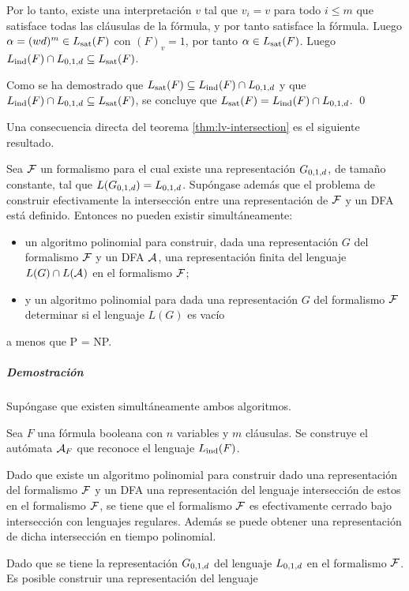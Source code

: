 Por lo tanto, existe una interpretación $v$ tal que $v_i = v$ para todo $i \leq m$ que satisface todas las cláusulas de la fórmula, y por tanto satisface la fórmula. Luego $\alpha = (wd)^m \in L_{\mathrm{sat}}(F)$ con $(F)_v = 1$, por tanto $\alpha \in L_{\mathrm{sat}}(F)$. Luego $L_{\mathrm{ind}}(F) \cap L_{0,1,d} \subseteq L_{\mathrm{sat}}(F)$.

Como se ha demostrado que $L_{\mathrm{sat}}(F) \subseteq L_{\mathrm{ind}}(F) \cap L_{0,1,d}$ y que $L_{\mathrm{ind}}(F) \cap L_{0,1,d} \subseteq L_{\mathrm{sat}}(F)$, se concluye que $L_{\mathrm{sat}}(F) = L_{\mathrm{ind}}(F) \cap L_{0,1,d}$. \qed

Una consecuencia directa del teorema \ref{thm:lv-intersection} es el siguiente resultado.

\begin{theorem}
    \label{thm:el-teorema}
    Sea $\mathcal{F}$ un formalismo para el cual existe una representación $G_{0, 1, d}$, de tamaño constante, tal que $L(G_{0, 1, d}) = L_{0,1,d}$. Supóngase además que el problema de construir efectivamente la intersección entre una representación de $\mathcal{F}$ y un DFA está definido. Entonces no pueden existir simultáneamente:
    \begin{itemize}
        \item un algoritmo polinomial para construir, dada una representación $G$ del formalismo $\mathcal{F}$ y un DFA $\mathcal{A}_{}$, una representación finita del lenguaje $L(G) \cap L(\mathcal{A}_{})$ en el formalismo $\mathcal{F}$;
        \item y un algoritmo polinomial para dada una representación $G$ del formalismo $\mathcal{F}$ determinar si el lenguaje $L(G)$ es vacío
    \end{itemize}
    a menos que P = NP.
\end{theorem}

\subparagraph{Demostración} Supóngase que existen simultáneamente ambos algoritmos.

Sea $F$ una fórmula booleana con $n$ variables y $m$ cláusulas. Se construye el autómata $\mathcal{A}_{F}$ que reconoce el lenguaje $L_{\mathrm{ind}}(F)$.


Dado que existe un algoritmo polinomial para construir dado una representación del formalismo $\mathcal{F}$ y un DFA una representación del lenguaje intersección de estos en el formalismo $\mathcal{F}$, se tiene que el formalismo $\mathcal{F}$ es efectivamente cerrado bajo intersección con lenguajes regulares. Además se puede obtener una representación de dicha intersección en tiempo polinomial.

Dado que se tiene la representación $G_{0, 1, d}$ del lenguaje $L_{0,1,d}$ en el formalismo $\mathcal{F}$. Es posible construir una representación del lenguaje

